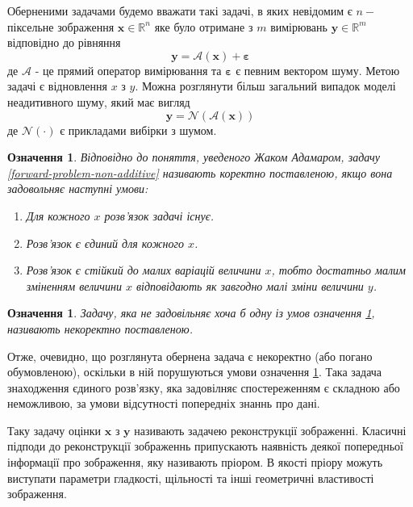 \documentclass[14pt,a4paper]{extarticle}
\newcounter{e}
\newtheorem{defn}[theorem]{Означення}
\numberwithin{equation}{section}
\numberwithin{figure}{section}
\begin{document}
	
	
	
	Оберненими задачами будемо вважати такі задачі, в яких невідомим є $n-$ піксельне зображення $\boldsymbol{x} \in \mathbb{R}^{n}$ яке було отримане з $m$ вимірювань $\boldsymbol{y} \in \mathbb{R}^{m}$ відповідно до рівняння
	\begin{equation}
	\label{forward-problem}
	\boldsymbol{y}=\mathcal{A}\left(\boldsymbol{x}\right)+\boldsymbol{\varepsilon}
	\end{equation}
	де $\mathcal{A}$ - це прямий оператор вимірювання та $\boldsymbol{\varepsilon}$ є певним вектором шуму. Метою задачі є відновлення $x$ з $y$. Можна розглянути більш загальний випадок моделі неадитивного шуму, який має вигляд 
	\begin{equation}
	\label{forward-problem-non-additive}
	\boldsymbol{y}=\mathcal{N}\left(\mathcal{A}\left(\boldsymbol{x}\right)\right)
	\end{equation}
	де $\mathcal{N}(\cdot)$ є прикладами вибірки з шумом.


	\begin{defn}
		\label{well-posed}
		Відповідно до поняття, уведеного Жаком Адамаром, задачу \ref{forward-problem-non-additive} називають коректно поставленою, якщо вона задовольняє наступні умови: 
		\begin{enumerate}
			\item Для кожного $x$ розв'язок задачі існує.
			\item Розв'язок є єдиний для кожного $x$.
			\item Розв'язок є стійкий до малих варіацій величини $x$, тобто достатньо малим зміненням величини $x$ відповідають як завгодно малі зміни величини $y$.
		\end{enumerate}
	\end{defn}

	\begin{defn}
		\label{ill-posed}	
		Задачу, яка не задовільняє хоча б одну із умов означення \ref{well-posed}, називають некоректно поставленою.
	\end{defn}

	Отже, очевидно, що розглянута обернена задача є некоректно (або погано обумовленою), оскільки в ній порушуються умови означення \ref{well-posed}. Така задача знаходження єдиного розв'язку, яка задовілняє спостереженням є складною або неможливою, за умови відсутності попередніх знаннь про дані.

	Таку задачу оцінки $\boldsymbol{x}$ з $\boldsymbol{y}$ називають задачею реконструкції зображенні. Класичні підподи до реконструкції зображеннь припускають наявність деякої попередньої інформації про зображення, яку називають пріором. В якості пріору можуть виступати параметри гладкості, щільності та інші геометричні властивості зображення.
\end{document}

